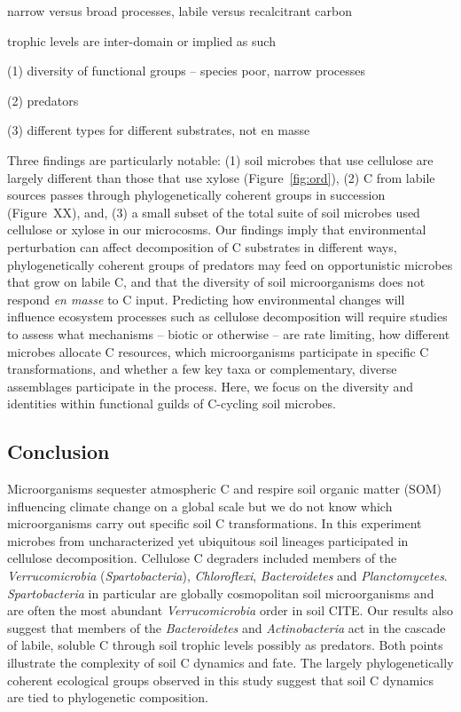 narrow versus broad processes, labile versus recalcitrant carbon

trophic levels are inter-domain or implied as such

(1) diversity of functional groups -- species poor, narrow processes 

(2) predators

(3) different types for different substrates, not en masse

Three findings are particularly notable: (1) soil microbes that use cellulose
are largely different than those that use xylose (Figure~\ref{fig:ord}), (2)
C from labile sources passes through phylogenetically coherent groups in
succession (Figure~XX), and, (3) a small subset of the total suite of soil
microbes used cellulose or xylose in our microcosms. Our findings imply that
environmental perturbation can affect decomposition of C substrates in
different ways, phylogenetically coherent groups of predators may feed on
opportunistic microbes that grow on labile C, and that the diversity of soil
microorganisms does not respond \textit{en masse} to C input. Predicting how
environmental changes will influence ecosystem processes such as cellulose
decomposition will require studies to assess what mechanisms -- biotic or
otherwise -- are rate limiting, how different microbes allocate C resources,
which microorganisms participate in specific C transformations, and whether
a few key taxa or complementary, diverse assemblages participate in the
process. Here, we focus on the diversity and identities within functional
guilds of C-cycling soil microbes.

\subsection{Conclusion} 
Microorganisms sequester atmospheric C and respire soil organic
matter (SOM) influencing climate change on a global scale but we do not
know which microorganisms carry out specific soil C transformations. In
this experiment microbes from uncharacterized yet ubiquitous soil lineages
participated in cellulose decomposition. Cellulose C degraders included
members of the \textit{Verrucomicrobia} (\textit{Spartobacteria}),
\textit{Chloroflexi}, \textit{Bacteroidetes} and \textit{Planctomycetes}.
\textit{Spartobacteria} in particular are globally cosmopolitan soil
microorganisms and are often the most abundant \textit{Verrucomicrobia}
order in soil CITE. Our results also suggest that members of the
\textit{Bacteroidetes} and \textit{Actinobacteria} act in the cascade of
labile, soluble C through soil trophic levels possibly as predators. Both
points illustrate the complexity of soil C dynamics and fate. The largely
phylogenetically coherent ecological groups observed in this study suggest that
soil C dynamics are tied to phylogenetic composition.
